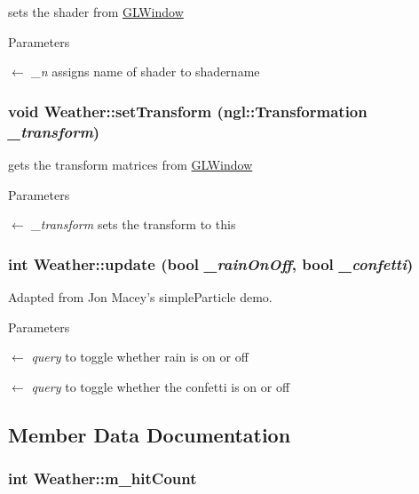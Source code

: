 sets the shader from \hyperlink{classGLWindow}{GLWindow} 
\begin{DoxyParams}{Parameters}
\item[\mbox{$\leftarrow$} {\em \_\-n}]assigns name of shader to shadername \end{DoxyParams}
\hypertarget{classWeather_ad3fcb872dcd988251b3feb29bf4b1303}{
\subsubsection[{setTransform}]{\setlength{\rightskip}{0pt plus 5cm}void Weather::setTransform (ngl::Transformation {\em \_\-transform})}}
\label{classWeather_ad3fcb872dcd988251b3feb29bf4b1303}


gets the transform matrices from \hyperlink{classGLWindow}{GLWindow} 
\begin{DoxyParams}{Parameters}
\item[\mbox{$\leftarrow$} {\em \_\-transform}]sets the transform to this \end{DoxyParams}
\hypertarget{classWeather_ac6f35667da53d25e368ca7c55b1635f0}{
\subsubsection[{update}]{\setlength{\rightskip}{0pt plus 5cm}int Weather::update (bool {\em \_\-rainOnOff}, \/  bool {\em \_\-confetti})}}
\label{classWeather_ac6f35667da53d25e368ca7c55b1635f0}


Adapted from Jon Macey's simpleParticle demo. 
\begin{DoxyParams}{Parameters}
\item[\mbox{$\leftarrow$} {\em query}]to toggle whether rain is on or off \item[\mbox{$\leftarrow$} {\em query}]to toggle whether the confetti is on or off \end{DoxyParams}


\subsection{Member Data Documentation}
\hypertarget{classWeather_a5865ebcfd559433fe19caa4f53e0d61f}{
\subsubsection[{m\_\-hitCount}]{\setlength{\rightskip}{0pt plus 5cm}int {\bf Weather::m\_\-hitCount}}}
\label{classWeather_a5865ebcfd559433fe19caa4f53e0d61f}


